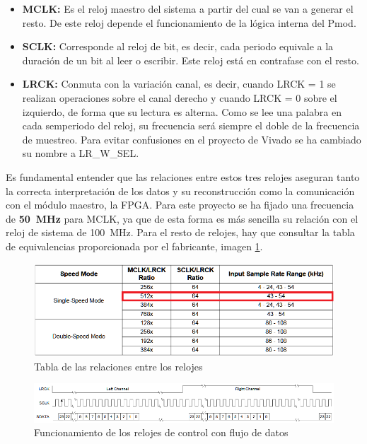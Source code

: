 \begin{itemize}
\item \textbf{MCLK:} Es el reloj maestro del sistema a partir del cual se van a generar el resto. De este reloj depende el funcionamiento de la lógica interna del Pmod.
\item \textbf{SCLK:} Corresponde al reloj de bit, es decir, cada periodo equivale a la duración de un bit al leer o escribir. Este reloj está en contrafase con el resto.
\item \textbf{LRCK:} Conmuta con la variación canal, es decir, cuando LRCK = 1 se realizan operaciones sobre el canal derecho y cuando LRCK = 0 sobre el izquierdo, de forma que su lectura es alterna. Como se lee una palabra en cada semperiodo del reloj, su frecuencia será siempre el doble de la frecuencia de muestreo. Para evitar confusiones en el proyecto de Vivado se ha cambiado su nombre a LR\_W\_SEL.
\end{itemize}

Es fundamental entender que las relaciones entre estos tres relojes aseguran tanto la correcta interpretación de los datos y su reconstrucción como la comunicación con el módulo maestro, la FPGA. Para este proyecto se ha fijado una frecuencia de \textbf{50~MHz} para MCLK, ya que de esta forma es más sencilla su relación con el reloj de sistema de 100~MHz. Para el resto de relojes, hay que consultar la tabla de equivalencias proporcionada por el fabricante, imagen \ref{fig:flujoreloj}.

\begin{figure}[!th]
\begin{center}
\includegraphics[width=15cm]{img/ratiosreloj.png}
\caption{\label{fig:flujoreloj}Tabla de las relaciones entre los relojes}
\end{center}
\end{figure}

\begin{figure}[!th]
\begin{center}
\includegraphics[width=14cm]{img/i2sov.png}
\caption{\label{fig:i2sov}Funcionamiento de los relojes de control con flujo de datos}
\end{center}
\end{figure}

